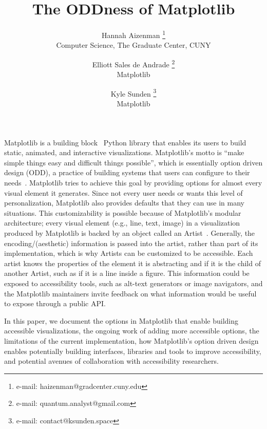 \documentclass{vgtc}                          %
\title{The ODDness of Matplotlib}
\author{Hannah Aizenman \thanks{e-mail: haizenman@gradcenter.cuny.edu}\\%
        \scriptsize Computer Science, The Graduate Center, CUNY %
\and Elliott Sales de Andrade \thanks{e-mail: quantum.analyst@gmail.com}\\%
        \scriptsize Matplotlib %
\and Kyle Sunden \thanks{e-mail: contact@ksunden.space}\\%
        \scriptsize Matplotlib %
}
\begin{document}


\maketitle




Matplotlib is a building block~\cite{wongsuphasawatNavigatingWideWorld2021}
Python library that enables its users to build static, animated, and interactive visualizations. Matplotlib's motto is ``make simple things easy and difficult things possible'', which is essentially option driven design (ODD), a practice of building systems that users can configure to their needs~\cite{elavskyOptionDrivenDesignContext2023}. Matplotlib tries to achieve this goal by providing options for almost every visual element it generates. Since not every user needs or wants this level of personalization, Matplotlib also provides defaults that they can use in many situations. This customizability is possible because of Matplotlib's modular architecture; every visual element (e.g., line, text, image) in a visualization produced by Matplotlib is backed by an object called an Artist~\cite{hunterArchitectureOpenSource}. Generally, the encoding/(aesthetic) information is passed into the artist, rather than part of its implementation, which is why Artists can be customized to be accessible. Each artist knows the properties of the element it is abstracting and if it is the child of another Artist, such as if it is a line inside a figure. This information could be exposed to accessibility tools, such as alt-text generators or image navigators, and the Matplotlib maintainers invite feedback on what information would be useful to expose through a public API.

In this paper, we document the options in Matplotlib that enable building accessible visualizations, the ongoing work of adding more accessible options, the limitations of the current implementation, how Matplotlib's option driven design enables potentially building interfaces, libraries and tools to improve accessibility, and potential avenues of collaboration with accessibility researchers. 
\end{document}
